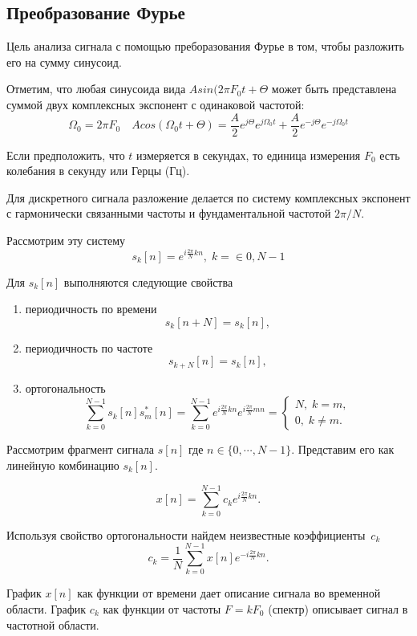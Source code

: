 \documentclass[oneside, final, 14pt]{extarticle}
\begin{document}
\subsection{Преобразование Фурье}
  Цель анализа сигнала с помощью преборазования Фурье
  в том, чтобы разложить его на сумму синусоид.

  Отметим, что любая синусоида вида $A sin (2 \pi F_0 t + \Theta$
  может быть представлена суммой двух комплексных экспонент с одинаковой
  частотой:
  \[
    \Omega_0 = 2 \pi F_0 \quad
    A cos(\Omega_0 t + \Theta) =
    \frac{A}{2} e^{j\Theta} e^{j\Omega_0 t} +
    \frac{A}{2} e^{-j\Theta} e^{-j\Omega_0 t}
  \]

  Если предположить, что $t$ измеряется в секундах, то единица измерения
  $F_0$ есть колебания в секунду или Герцы (Гц).

  Для дискретного сигнала разложение делается по систему
  комплексных экспонент с гармонически связанными частоты и
  фундаментальной частотой $2 \pi / N$.

  Рассмотрим эту систему
  \[
    s_k[n]=e^{i\tfrac{2\pi}{N}kn}, \; k=\in{0,N-1}
  \]

  Для $s_k[n]$ выполняются следующие свойства

  \begin{enumerate}
  \item периодичность по времени \[
    s_k[n + N] = s_k[n],
  \]
  \item периодичность по частоте
  \[
    s_{k+N}[n] = s_k[n],
  \]
  \item ортогональность
  \[
    \sum_{k=0}^{N-1} s_k[n]s_m^*[n] =
    \sum_{k=0}^{N-1} e^{i\tfrac{2\pi}{N}kn} e^{i\tfrac{2\pi}{N}mn} =
    \left\{ \begin{aligned}
        N, \; k = m ,\\
        0, \; k \not= m.
      \end{aligned}
    \right.
  \]
  \end{enumerate}

  Рассмотрим фрагмент сигнала $s[n]$ где $n \in \{0,\cdots,N-1\}$.
  Представим его как линейную комбинацию $s_k[n]$.

  \[
    x[n] = \sum_{k=0}^{N-1} c_k e^{i\tfrac{2\pi}{N}kn}.
  \]

  Используя свойство ортогональности найдем неизвестные коэффициенты~$c_k$
  \[
    c_k = \dfrac{1}{N} \sum_{k=0}^{N-1} x[n] e^{-i\tfrac{2\pi}{N}kn}.
  \]

  График $x[n]$ как функции от времени дает описание сигнала во временной
  области. График $c_k$ как функции от частоты $F = k F_0$ (спектр)
  описывает сигнал в частотной области.
\end{document}
